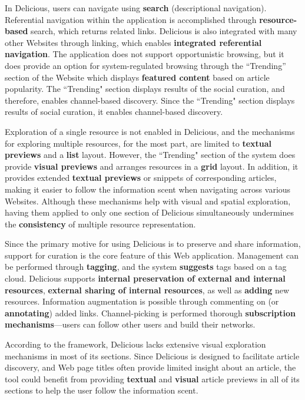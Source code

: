 \documentclass{sigchi}
\begin{document}
{{In Delicious, users can navigate using \textbf{search} (descriptional navigation). Referential navigation within the application is accomplished through \textbf{resource-based} search, which returns related links. Delicious is also integrated with many other Websites through linking, which enables \textbf{integrated referential navigation}. The application does not support opportunistic browsing, but it does provide an option for system-regulated browsing through the ``Trending'' section of the Website which displays \textbf{featured content} based on article popularity. The ``Trending" section displays results of the social curation, and therefore, enables channel-based discovery. Since the ``Trending" section displays results of social curation, it enables channel-based discovery.

Exploration of a single resource is not enabled in Delicious, and the mechanisms for exploring multiple resources, for the most part, are limited to \textbf{textual previews} and a \textbf{list} layout. However, the ``Trending" section of the system does provide \textbf{visual previews} and arranges resources in a \textbf{grid} layout. In addition, it provides extended \textbf{textual previews} or snippets of corresponding articles, making it easier to follow the information scent when navigating across various Websites. Although these mechanisms help with visual and spatial exploration, having them applied to only one section of Delicious simultaneously undermines the \textbf{consistency} of multiple resource representation. 

Since the primary motive for using Delicious is to preserve and share information, support for curation is the core feature of this Web application. Management can be performed through \textbf{tagging}, and the system \textbf{suggests} tags based on a tag cloud. Delicious supports \textbf{internal preservation of external and internal resources}, \textbf{external sharing of internal resources}, as well as \textbf{adding} new resources. Information augmentation is possible through commenting on (or \textbf{annotating}) added links. Channel-picking is performed thorough \textbf{subscription mechanisms}---users can follow other users and build their networks. 

According to the framework, Delicious lacks extensive visual exploration mechanisms in most of its sections. Since Delicious is designed to facilitate article discovery, and Web page titles often provide limited insight about an article, the tool could benefit from providing \textbf{textual} and \textbf{visual} article previews in all of its sections to help the user follow the information scent. 
} %

}
\end{document}
